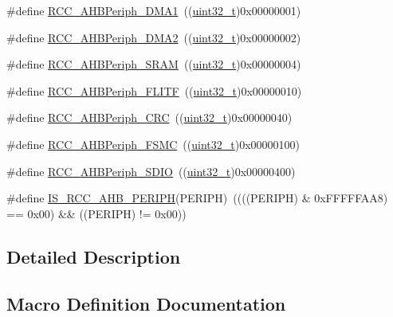\begin{DoxyCompactItemize}
\item 
\#define \hyperlink{group___a_h_b__peripheral_gaf32783f8481c4343726994073918b3ff}{R\+C\+C\+\_\+\+A\+H\+B\+Periph\+\_\+\+D\+M\+A1}~((\hyperlink{_p_e___types_8h_a33594304e786b158f3fb30289278f5af}{uint32\+\_\+t})0x00000001)
\item 
\#define \hyperlink{group___a_h_b__peripheral_ga5afb68e40dc0b0f1aa00466e49bc9e70}{R\+C\+C\+\_\+\+A\+H\+B\+Periph\+\_\+\+D\+M\+A2}~((\hyperlink{_p_e___types_8h_a33594304e786b158f3fb30289278f5af}{uint32\+\_\+t})0x00000002)
\item 
\#define \hyperlink{group___a_h_b__peripheral_ga8aec305b766b1c0ae297f8e1be103bd1}{R\+C\+C\+\_\+\+A\+H\+B\+Periph\+\_\+\+S\+R\+AM}~((\hyperlink{_p_e___types_8h_a33594304e786b158f3fb30289278f5af}{uint32\+\_\+t})0x00000004)
\item 
\#define \hyperlink{group___a_h_b__peripheral_ga4277d70aa6b5e0b1ec6c8fb8180aac08}{R\+C\+C\+\_\+\+A\+H\+B\+Periph\+\_\+\+F\+L\+I\+TF}~((\hyperlink{_p_e___types_8h_a33594304e786b158f3fb30289278f5af}{uint32\+\_\+t})0x00000010)
\item 
\#define \hyperlink{group___a_h_b__peripheral_gaef0cd08bcf96323324f328675ccd5ac3}{R\+C\+C\+\_\+\+A\+H\+B\+Periph\+\_\+\+C\+RC}~((\hyperlink{_p_e___types_8h_a33594304e786b158f3fb30289278f5af}{uint32\+\_\+t})0x00000040)
\item 
\#define \hyperlink{group___a_h_b__peripheral_ga857dbf7044a974efb142c4450eafd609}{R\+C\+C\+\_\+\+A\+H\+B\+Periph\+\_\+\+F\+S\+MC}~((\hyperlink{_p_e___types_8h_a33594304e786b158f3fb30289278f5af}{uint32\+\_\+t})0x00000100)
\item 
\#define \hyperlink{group___a_h_b__peripheral_gaa2664a55eedcedff22532982ae753566}{R\+C\+C\+\_\+\+A\+H\+B\+Periph\+\_\+\+S\+D\+IO}~((\hyperlink{_p_e___types_8h_a33594304e786b158f3fb30289278f5af}{uint32\+\_\+t})0x00000400)
\item 
\#define \hyperlink{group___a_h_b__peripheral_ga5fbf97a9c9f5742c94cde6ffe389aedc}{I\+S\+\_\+\+R\+C\+C\+\_\+\+A\+H\+B\+\_\+\+P\+E\+R\+I\+PH}(P\+E\+R\+I\+PH)~((((P\+E\+R\+I\+PH) \& 0x\+F\+F\+F\+F\+F\+A\+A8) == 0x00) \&\& ((\+P\+E\+R\+I\+P\+H) != 0x00))
\end{DoxyCompactItemize}


\subsection{Detailed Description}


\subsection{Macro Definition Documentation}
